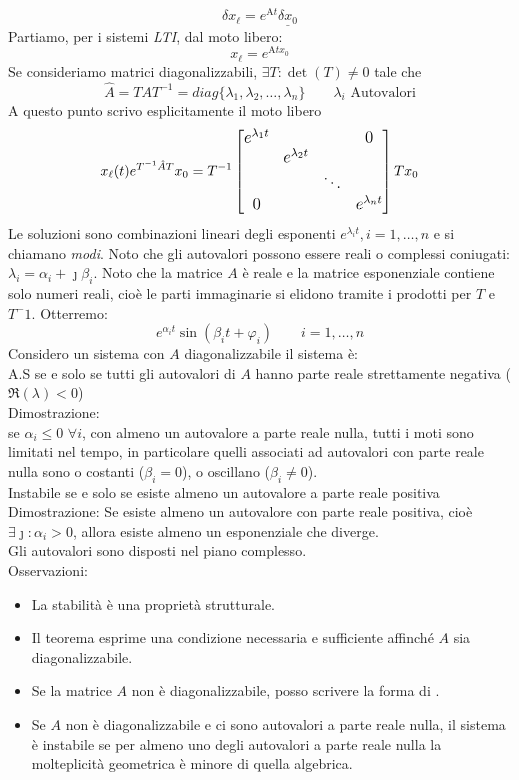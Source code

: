 	\[\delta x_\ell = e^{\text{A}t}\underline{\delta x_0}\]
	Partiamo, per i sistemi \emph{LTI}, dal moto libero:
	\[x_\ell = e^{\text{A}tx_0}\]
	Se consideriamo matrici diagonalizzabili, $ \exists T: \det(T) \not=0 $ tale che 
	\[\hat{A} = TAT^{-1} = diag\{\lambda_1, \lambda_2,\dots,\lambda_n\} \qquad \lambda_i \text{ Autovalori}\]
	A questo punto scrivo esplicitamente il moto libero
	\[x_\ell(t) e^{T^{-1}\hat{A}T}x_0 = T^{-1}\large\left[\begin{matrix}
		e^{\lambda_1t} & && 0\\
		& e^{\lambda_2t}&&  \\
		& & \ddots&\\
		0 & & & e^{\lambda_nt}
	\end{matrix}\large\right] T x_0\] 
	Le soluzioni sono combinazioni lineari degli esponenti $ e^{\lambda_it} ,i =1,\dots,n$ e si chiamano \emph{modi}. Noto che gli autovalori possono essere reali o complessi coniugati: $ \lambda_i =\alpha_i +\jmath\beta_i $. Noto che la matrice $ A $ è reale e la matrice esponenziale contiene solo numeri reali, cioè le parti immaginarie si elidono tramite i prodotti per $ T $ e $ T^-1 $. Otterremo:
	\begin{equation*}
		\boxed{e^{\alpha_it}\sin(\beta_it+\varphi_i)}\qquad i=1,\dots,n
	\end{equation*}
	Considero un sistema con $ A $ diagonalizzabile il sistema è:\\
	A.S se e solo se tutti gli autovalori di $ A $ hanno parte reale strettamente negativa ($\Re(\lambda)<0$)\\
	Dimostrazione:\\
	se $ \alpha_i\leq0 \,\,\forall i $, con almeno un autovalore a parte reale nulla, tutti i moti sono limitati nel tempo, in particolare quelli associati ad autovalori con parte reale nulla sono o costanti ($ \beta_i = 0 $), o oscillano ($ \beta_i \not=0 $).\\
	\colorbox{gray!20}{Instabile se e solo se esiste almeno un autovalore a parte reale positiva}\\
	Dimostrazione:
	Se esiste almeno un autovalore con parte reale positiva, cioè $ \exists \jmath : \alpha_i>0 $, allora esiste almeno un esponenziale che diverge.\\
	Gli autovalori sono disposti nel piano complesso.\\
	Osservazioni:
	\begin{itemize}
		\item La stabilità è una proprietà strutturale.
		\item Il teorema esprime una condizione necessaria e sufficiente affinché $ A $ sia diagonalizzabile.
		\item Se la matrice $ A $ non è diagonalizzabile, posso scrivere la forma di .
		\item Se $ A $ non è diagonalizzabile e ci sono autovalori a parte reale nulla, il sistema è instabile se per almeno uno degli autovalori a parte reale nulla la molteplicità geometrica è minore di quella algebrica.
	\end{itemize}
